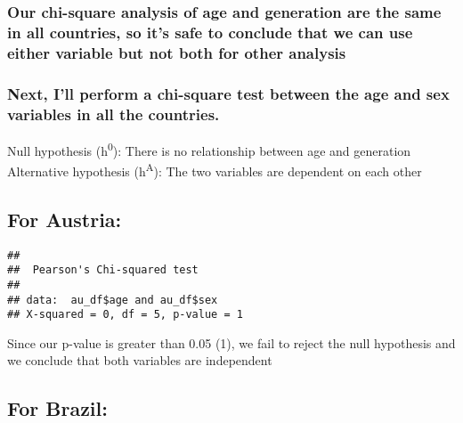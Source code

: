 \documentclass[
]{article}
\newenvironment{Shaded}{\begin{snugshade}}{\end{snugshade}}
\newcommand{\FunctionTok}[1]{\textcolor[rgb]{0.00,0.00,0.00}{#1}}
\newcommand{\NormalTok}[1]{#1}
\newcommand{\SpecialCharTok}[1]{\textcolor[rgb]{0.00,0.00,0.00}{#1}}
\begin{document}
\hypertarget{our-chi-square-analysis-of-age-and-generation-are-the-same-in-all-countries-so-its-safe-to-conclude-that-we-can-use-either-variable-but-not-both-for-other-analysis}{%
\subsubsection{Our chi-square analysis of age and generation are the
same in all countries, so it's safe to conclude that we can use either
variable but not both for other
analysis}\label{our-chi-square-analysis-of-age-and-generation-are-the-same-in-all-countries-so-its-safe-to-conclude-that-we-can-use-either-variable-but-not-both-for-other-analysis}}

\hypertarget{next-ill-perform-a-chi-square-test-between-the-age-and-sex-variables-in-all-the-countries.}{%
\subsubsection{Next, I'll perform a chi-square test between the age and
sex variables in all the
countries.}\label{next-ill-perform-a-chi-square-test-between-the-age-and-sex-variables-in-all-the-countries.}}

Null hypothesis (h\textsuperscript{0}): There is no relationship between
age and generation Alternative hypothesis (h\textsuperscript{A}): The
two variables are dependent on each other

\hypertarget{for-austria}{%
\subsection{For Austria:}\label{for-austria}}

\begin{Shaded}
\end{Shaded}

\begin{verbatim}
## 
##  Pearson's Chi-squared test
## 
## data:  au_df$age and au_df$sex
## X-squared = 0, df = 5, p-value = 1
\end{verbatim}

Since our p-value is greater than 0.05 (1), we fail to reject the null
hypothesis and we conclude that both variables are independent

\hypertarget{for-brazil-2}{%
\subsection{For Brazil:}\label{for-brazil-2}}
\end{document}
